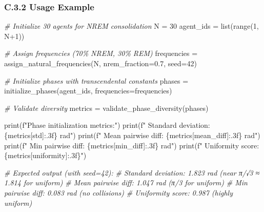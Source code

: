 \documentclass[
]{article}
\newenvironment{Shaded}{}{}
\newcommand{\BuiltInTok}[1]{\textcolor[rgb]{0.00,0.50,0.00}{#1}}
\newcommand{\CommentTok}[1]{\textcolor[rgb]{0.38,0.63,0.69}{\textit{#1}}}
\newcommand{\DecValTok}[1]{\textcolor[rgb]{0.25,0.63,0.44}{#1}}
\newcommand{\FloatTok}[1]{\textcolor[rgb]{0.25,0.63,0.44}{#1}}
\newcommand{\NormalTok}[1]{#1}
\newcommand{\OperatorTok}[1]{\textcolor[rgb]{0.40,0.40,0.40}{#1}}
\newcommand{\SpecialCharTok}[1]{\textcolor[rgb]{0.25,0.44,0.63}{#1}}
\newcommand{\SpecialStringTok}[1]{\textcolor[rgb]{0.73,0.40,0.53}{#1}}
\newcommand{\StringTok}[1]{\textcolor[rgb]{0.25,0.44,0.63}{#1}}
\begin{document}
\subsubsection{C.3.2 Usage Example}\label{c.3.2-usage-example}

\begin{Shaded}
\begin{Highlighting}[]
\CommentTok{\# Initialize 30 agents for NREM consolidation}
\NormalTok{N }\OperatorTok{=} \DecValTok{30}
\NormalTok{agent\_ids }\OperatorTok{=} \BuiltInTok{list}\NormalTok{(}\BuiltInTok{range}\NormalTok{(}\DecValTok{1}\NormalTok{, N}\OperatorTok{+}\DecValTok{1}\NormalTok{))}

\CommentTok{\# Assign frequencies (70\% NREM, 30\% REM)}
\NormalTok{frequencies }\OperatorTok{=}\NormalTok{ assign\_natural\_frequencies(N, nrem\_fraction}\OperatorTok{=}\FloatTok{0.7}\NormalTok{, seed}\OperatorTok{=}\DecValTok{42}\NormalTok{)}

\CommentTok{\# Initialize phases with transcendental constants}
\NormalTok{phases }\OperatorTok{=}\NormalTok{ initialize\_phases(agent\_ids, frequencies}\OperatorTok{=}\NormalTok{frequencies)}

\CommentTok{\# Validate diversity}
\NormalTok{metrics }\OperatorTok{=}\NormalTok{ validate\_phase\_diversity(phases)}

\BuiltInTok{print}\NormalTok{(}\SpecialStringTok{f"Phase initialization metrics:"}\NormalTok{)}
\BuiltInTok{print}\NormalTok{(}\SpecialStringTok{f"  Standard deviation: }\SpecialCharTok{\{}\NormalTok{metrics[}\StringTok{\textquotesingle{}std\textquotesingle{}}\NormalTok{]}\SpecialCharTok{:.3f\}}\SpecialStringTok{ rad"}\NormalTok{)}
\BuiltInTok{print}\NormalTok{(}\SpecialStringTok{f"  Mean pairwise diff: }\SpecialCharTok{\{}\NormalTok{metrics[}\StringTok{\textquotesingle{}mean\_diff\textquotesingle{}}\NormalTok{]}\SpecialCharTok{:.3f\}}\SpecialStringTok{ rad"}\NormalTok{)}
\BuiltInTok{print}\NormalTok{(}\SpecialStringTok{f"  Min pairwise diff:  }\SpecialCharTok{\{}\NormalTok{metrics[}\StringTok{\textquotesingle{}min\_diff\textquotesingle{}}\NormalTok{]}\SpecialCharTok{:.3f\}}\SpecialStringTok{ rad"}\NormalTok{)}
\BuiltInTok{print}\NormalTok{(}\SpecialStringTok{f"  Uniformity score:   }\SpecialCharTok{\{}\NormalTok{metrics[}\StringTok{\textquotesingle{}uniformity\textquotesingle{}}\NormalTok{]}\SpecialCharTok{:.3f\}}\SpecialStringTok{"}\NormalTok{)}

\CommentTok{\# Expected output (with seed=42):}
\CommentTok{\#   Standard deviation: 1.823 rad  (near π/√3 ≈ 1.814 for uniform)}
\CommentTok{\#   Mean pairwise diff: 1.047 rad  (π/3 for uniform)}
\CommentTok{\#   Min pairwise diff:  0.083 rad  (no collisions)}
\CommentTok{\#   Uniformity score:   0.987      (highly uniform)}
\end{Highlighting}
\end{Shaded}
\end{document}

